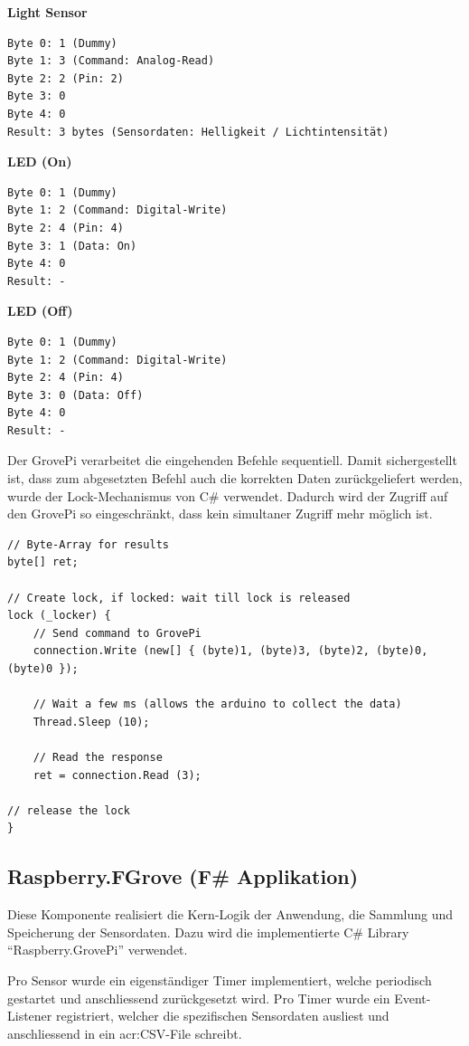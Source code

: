 \textbf{Light Sensor}
\begin{lstlisting}
Byte 0: 1 (Dummy)
Byte 1: 3 (Command: Analog-Read)
Byte 2: 2 (Pin: 2)
Byte 3: 0
Byte 4: 0
Result: 3 bytes (Sensordaten: Helligkeit / Lichtintensität)
\end{lstlisting}


\textbf{LED (On)}
\begin{lstlisting}
Byte 0: 1 (Dummy)
Byte 1: 2 (Command: Digital-Write)
Byte 2: 4 (Pin: 4)
Byte 3: 1 (Data: On)
Byte 4: 0
Result: -
\end{lstlisting}

\textbf{LED (Off)}
\begin{lstlisting}
Byte 0: 1 (Dummy)
Byte 1: 2 (Command: Digital-Write)
Byte 2: 4 (Pin: 4)
Byte 3: 0 (Data: Off)
Byte 4: 0
Result: -
\end{lstlisting}


Der GrovePi verarbeitet die eingehenden Befehle sequentiell. Damit sichergestellt ist, dass zum abgesetzten Befehl auch die korrekten Daten zurückgeliefert werden, wurde der Lock-Mechanismus von C\# verwendet. Dadurch wird der Zugriff auf den GrovePi so eingeschränkt, dass kein simultaner Zugriff mehr möglich ist.

\begin{lstlisting}
// Byte-Array for results
byte[] ret; 

// Create lock, if locked: wait till lock is released
lock (_locker) { 
	// Send command to GrovePi
	connection.Write (new[] { (byte)1, (byte)3, (byte)2, (byte)0, (byte)0 }); 
	
	// Wait a few ms (allows the arduino to collect the data)
	Thread.Sleep (10); 
	
	// Read the response
	ret = connection.Read (3); 
	
// release the lock
} 
\end{lstlisting}


\subsection{Raspberry.FGrove (F\# Applikation)}
\label{sec:AnalyseCollection:application}
Diese Komponente realisiert die Kern-Logik der Anwendung, die Sammlung und Speicherung der Sensordaten. Dazu wird die implementierte C\# Library "`Raspberry.GrovePi"' verwendet.

Pro Sensor wurde ein eigenständiger Timer implementiert, welche periodisch gestartet und anschliessend zurückgesetzt wird. Pro Timer wurde ein Event-Listener registriert, welcher die spezifischen Sensordaten ausliest und anschliessend in ein \gls{acr:CSV}-File schreibt.

